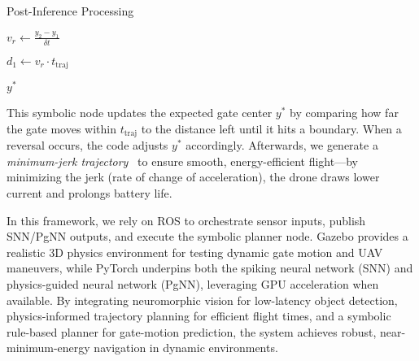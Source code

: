 \begin{algorithm}[t]
\caption{Post-Inference Processing}
\label{algo:planner}

$v_r \gets \frac{y_2 - y_1}{\delta t}$ 

$d_1 \gets v_r \cdot t_{\mathrm{traj}}$



\Return $y^*$
\end{algorithm}


This symbolic node updates the expected gate center \( y^* \) by comparing how far the gate moves within \( t_{\mathrm{traj}} \) to the distance left until it hits a boundary. When a reversal occurs, the code adjusts \( y^* \) accordingly. Afterwards, we generate a \emph{minimum-jerk trajectory}~\cite{mellinger2011minimum} to ensure smooth, energy-efficient flight—by minimizing the jerk (rate of change of acceleration), the drone draws lower current and prolongs battery life.


In this framework, we rely on ROS to orchestrate sensor inputs, publish SNN/PgNN outputs, and execute the symbolic planner node. Gazebo provides a realistic 3D physics environment for testing dynamic gate motion and UAV maneuvers, while PyTorch underpins both the spiking neural network (SNN) and physics-guided neural network (PgNN), leveraging GPU acceleration when available. By integrating neuromorphic vision for low-latency object detection, physics-informed trajectory planning for efficient flight times, and a symbolic rule-based planner for gate-motion prediction, the system achieves robust, near-minimum-energy navigation in dynamic environments.